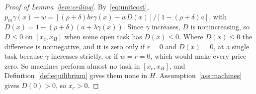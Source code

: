 \documentclass[12pt]{article}
\theoremstyle{plain}
\theoremstyle{definition}
\theoremstyle{remark}
\begin{document}
\begin{proof}[Proof of Lemma~\ref{lem:ceiling}]
By~\eqref{eq:unitcost}, $p_m\gamma(x)-w=[(\rho+\delta)br\gamma(x)-wD(x)]/[1-(\rho+\delta)a]$, with $D(x)=1-(\rho+\delta)(a+\lambda\gamma(x))$. Since $\gamma$ increases, $D$ is nonincreasing, so $D\le0$ on $[x_c,x_H]$ when some open task has $D(x)\le0$. Where $D(x)\le0$ the difference is nonnegative, and it is zero only if $r=0$ and $D(x)=0$, at a single task because $\gamma$ increases strictly, or if $w=r=0$, which would make every price zero. So machines perform almost no task in $[x_c,x_H]$, and Definition~\ref{def:equilibrium} gives them none in $H$. Assumption~\ref{ass:machines} gives $D(0)>0$, so $x_c>0$.
\end{proof}
\end{document}

